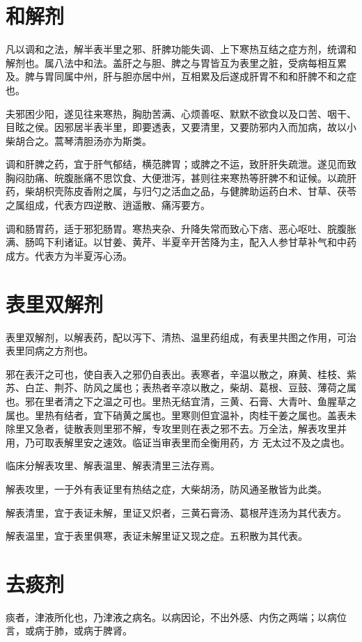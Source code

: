 \documentclass[UTF8]{ctexart}
\begin{document}
\section{和解剂}

凡以调和之法，解半表半里之邪、肝脾功能失调、上下寒热互结之症方剂，统谓和解剂也。属八法中和法。盖肝之与胆、脾之与胃皆互为表里之脏，受病每相互累及。脾与胃同属中州，肝与胆亦居中州，互相累及后遂成肝胃不和和肝脾不和之症也。

夫邪困少阳，遂见往来寒热，胸肋苦满、心烦善呕、默默不欲食以及口苦、咽干、目眩之侯。因邪居半表半里，即要透表，又要清里，又要防邪内入而加病，故以小柴胡合之。蒿琴清胆汤亦为斯类。

调和肝脾之药，宜于肝气郁结，横范脾胃；或脾之不运，致肝肝失疏泄。遂见而致胸闷肋痛、皖腹胀痛不思饮食、大便泄泻，甚则往来寒热等肝脾不和证候。以疏肝药，柴胡枳壳陈皮香附之属，与归勺之活血之品，与健脾助运药白术、甘草、茯苓之属组成，代表方四逆散、逍遥散、痛泻要方。

调和肠胃药，适于邪犯肠胃。寒热夹杂、升降失常而致心下痞、恶心呕吐、脘腹胀满、肠鸣下利诸证。以甘姜、黄芹、半夏辛开苦降为主，配入人参甘草补气和中药成方。代表方为半夏泻心汤。

\section{表里双解剂}
表里双解剂，以解表药，配以泻下、清热、温里药组成，有表里共图之作用，可治表里同病之方剂也。

邪在表汗之可也，使自表入之邪仍自表出。表寒者，辛温以散之，麻黄、桂枝、紫苏、白芷、荆芥、防风之属也；表热者辛凉以散之，柴胡、葛根、豆鼓、薄荷之属也。邪在里者清之下之温之可也。里热无结宜清，三黄、石膏、大青叶、鱼腥草之属也。里热有结者，宜下硝黄之属也。里寒则但宜温补，肉桂干姜之属也。盖表未除里又急者，徒散表则里邪不解，专攻里则在表之邪不去。万全法，解表攻里并用，乃可取表解里安之速效。临证当审表里而全衡用药，方 无太过不及之虞也。

临床分解表攻里、解表温里、解表清里三法存焉。

解表攻里，一于外有表证里有热结之症，大柴胡汤，防风通圣散皆为此类。

解表清里，宜于表证未解，里证又炽者，三黄石膏汤、葛根芹连汤为其代表方。

解表温里，宜于表里俱寒，表证未解里证又现之症。五积散为其代表。

\section{去痰剂}
痰者，津液所化也，乃津液之病名。以病因论，不出外感、内伤之两端；以病位言，或病于肺，或病于脾肾。
\end{document}
